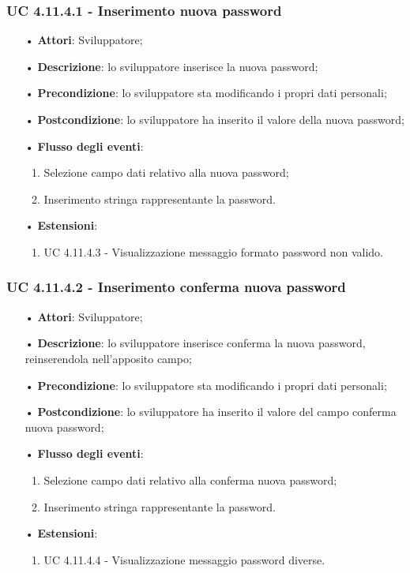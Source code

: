 \subsubsection{UC 4.11.4.1 - Inserimento nuova password}
\begin{itemize}
	\item[•]\textbf{Attori}: Sviluppatore;
	\item[•]\textbf{Descrizione}: lo sviluppatore inserisce la nuova password;
	\item[•]\textbf{Precondizione}: lo sviluppatore sta modificando i propri dati personali;
	\item[•]\textbf{Postcondizione}: lo sviluppatore ha inserito il valore della nuova password; 
	\item[•]\textbf{Flusso degli eventi}: 
	\begin{enumerate}
		\item Selezione campo dati relativo alla nuova password;
		\item Inserimento stringa rappresentante la password.
	\end{enumerate}
	\item[•]\textbf{Estensioni}:
	\begin{enumerate}
		\item UC 4.11.4.3 - Visualizzazione messaggio formato password non valido.
	\end{enumerate}
\end{itemize}

\subsubsection{UC 4.11.4.2 - Inserimento conferma nuova password}
\begin{itemize}
	\item[•]\textbf{Attori}: Sviluppatore;
	\item[•]\textbf{Descrizione}: lo sviluppatore inserisce conferma la nuova password, reinserendola nell'apposito campo;
	\item[•]\textbf{Precondizione}: lo sviluppatore sta modificando i propri dati personali;
	\item[•]\textbf{Postcondizione}: lo sviluppatore ha inserito il valore del campo conferma nuova password; 
	\item[•]\textbf{Flusso degli eventi}: 
	\begin{enumerate}
		\item Selezione campo dati relativo alla conferma nuova password;
		\item Inserimento stringa rappresentante la password.
	\end{enumerate}
	\item[•]\textbf{Estensioni}:
	\begin{enumerate}
		\item UC 4.11.4.4 - Visualizzazione messaggio password diverse.
	\end{enumerate}
\end{itemize}

